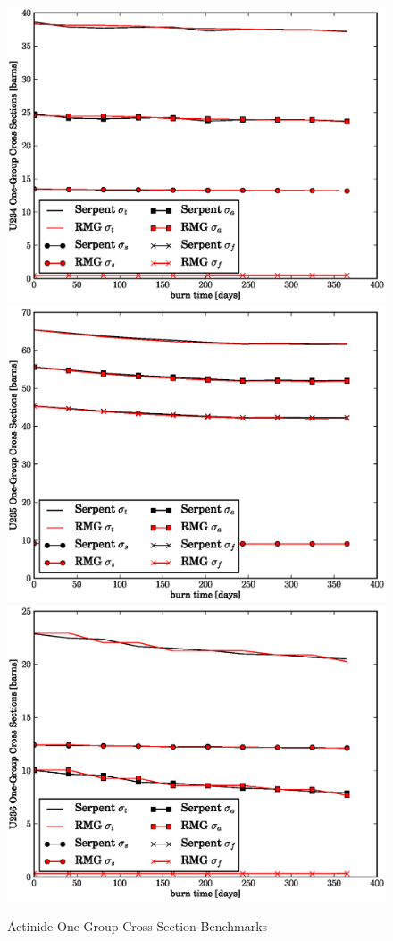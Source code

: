 \begin{figure}[htbp]
\caption{Actinide One-Group Cross-Section Benchmarks}
\label{act_xs_benchmark}
\begin{center}
\includegraphics[scale=0.3]{multigroup_method/figs/benchmark/U234_1g_xs.eps}
\includegraphics[scale=0.3]{multigroup_method/figs/benchmark/U235_1g_xs.eps}
\includegraphics[scale=0.3]{multigroup_method/figs/benchmark/U236_1g_xs.eps}

\end{center}
\end{figure}
